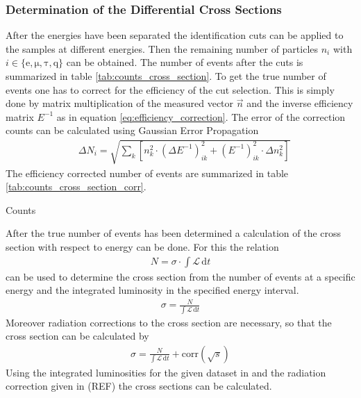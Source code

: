 \documentclass[11pt, a4paper]{article}
\numberwithin{equation}{section}
\newcommand\dinf[1]{ \,\mathrm{d}#1 }
\newcommand{\korr}[1]{{\color{red}(#1)}}
\begin{document}
\subsubsection{Determination of the Differential Cross Sections}
\label{sec:determination_cross_section}
After the energies have been separated the identification cuts can be applied to the samples at different energies.
Then the remaining number of particles $n_i$ with $i \in \{ \mathrm{e}, \mathrm{\mu}, \mathrm{\tau}, \mathrm{q} \}$ can be obtained.
The number of events after the cuts is summarized in table \ref{tab:counts_cross_section}.
To get the true number of events one has to correct for the efficiency of the cut selection.
This is simply done by matrix multiplication of the measured vector $\vec{n}$ and the inverse efficiency matrix $E^{-1}$ as in equation \eqref{eq:efficiency_correction}.
The error of the correction counts can be calculated using Gaussian Error Propagation
\begin{align*}
&\Delta N_i = \sqrt{\sum_k \left[ n_k^2 \cdot \left(\Delta E^{-1}\right)_{ik}^2 + \left(E^{-1}\right)_{ik}^2 \cdot \Delta n_k^2 \right]}
\end{align*}
The efficiency corrected number of events are summarized in table \ref{tab:counts_cross_section_corr}.

\begin{table}
	\begin{subtable}{1.0\textwidth}
		\centering
		
		\label{tab:counts_cross_section}
	\end{subtable}
	
	\vspace{0.5cm}
	
	\begin{subtable}{1.0\textwidth}
		\centering
		
		\label{tab:counts_cross_section_corr}
	\end{subtable}
	\caption{Counts}
\end{table}

After the true number of events has been determined a calculation of the cross section with respect to energy can be done.
For this the relation
\begin{align*}
	N = \sigma \cdot \int \mathcal{L} \dinf{t}
\end{align*}
can be used to determine the cross section from the number of events at a specific energy and the integrated luminosity in the specified energy interval.
\begin{align*}
	\sigma = \frac{N}{\int \mathcal{L} \dinf{t}}
\end{align*}
Moreover radiation corrections to the cross section are necessary, so that the cross section can be calculated by
\begin{align*}
	\sigma = \frac{N}{\int \mathcal{L} \dinf{t}} + \mathrm{corr}(\sqrt{s})
\end{align*}
Using the integrated luminosities for the given dataset in \cite{anleitung} and the radiation correction given in \korr{REF} the cross sections can be calculated.
\end{document}
